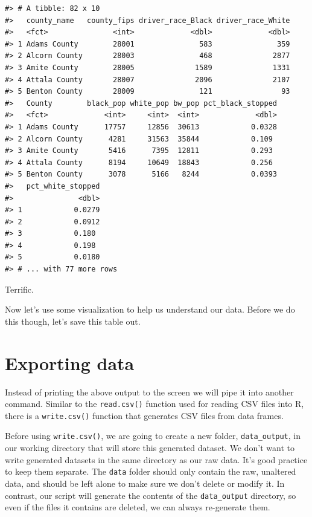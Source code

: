 \documentclass[]{book}
\begin{document}
\begin{verbatim}
#> # A tibble: 82 x 10
#>   county_name   county_fips driver_race_Black driver_race_White
#>   <fct>               <int>             <dbl>             <dbl>
#> 1 Adams County        28001               583               359
#> 2 Alcorn County       28003               468              2877
#> 3 Amite County        28005              1589              1331
#> 4 Attala County       28007              2096              2107
#> 5 Benton County       28009               121                93
#>   County        black_pop white_pop bw_pop pct_black_stopped
#>   <fct>             <int>     <int>  <int>             <dbl>
#> 1 Adams County      17757     12856  30613            0.0328
#> 2 Alcorn County      4281     31563  35844            0.109 
#> 3 Amite County       5416      7395  12811            0.293 
#> 4 Attala County      8194     10649  18843            0.256 
#> 5 Benton County      3078      5166   8244            0.0393
#>   pct_white_stopped
#>               <dbl>
#> 1            0.0279
#> 2            0.0912
#> 3            0.180 
#> 4            0.198 
#> 5            0.0180
#> # ... with 77 more rows
\end{verbatim}

Terrific.

Now let's use some visualization to help us understand our data. Before we do this though, let's save this table out.

\hypertarget{exporting-data}{%
\section{Exporting data}\label{exporting-data}}

Instead of printing the above output to the screen we will pipe it into another command. Similar to the \texttt{read.csv()} function used for reading CSV files into R, there is a \texttt{write.csv()} function that generates CSV files from data frames.

Before using \texttt{write.csv()}, we are going to create a new folder, \texttt{data\_output},
in our working directory that will store this generated dataset. We don't want
to write generated datasets in the same directory as our raw data. It's good
practice to keep them separate. The \texttt{data} folder should only contain the raw,
unaltered data, and should be left alone to make sure we don't delete or modify
it. In contrast, our script will generate the contents of the \texttt{data\_output}
directory, so even if the files it contains are deleted, we can always
re-generate them.
\end{document}
